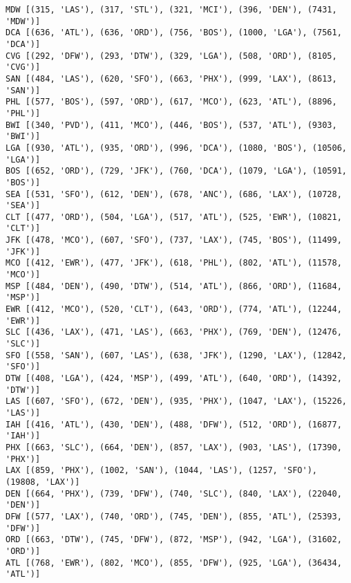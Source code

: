 \documentclass[11pt]{article}
\begin{document}
    \begin{Verbatim}[commandchars=\\\{\}]
MDW [(315, 'LAS'), (317, 'STL'), (321, 'MCI'), (396, 'DEN'), (7431, 'MDW')]
DCA [(636, 'ATL'), (636, 'ORD'), (756, 'BOS'), (1000, 'LGA'), (7561, 'DCA')]
CVG [(292, 'DFW'), (293, 'DTW'), (329, 'LGA'), (508, 'ORD'), (8105, 'CVG')]
SAN [(484, 'LAS'), (620, 'SFO'), (663, 'PHX'), (999, 'LAX'), (8613, 'SAN')]
PHL [(577, 'BOS'), (597, 'ORD'), (617, 'MCO'), (623, 'ATL'), (8896, 'PHL')]
BWI [(340, 'PVD'), (411, 'MCO'), (446, 'BOS'), (537, 'ATL'), (9303, 'BWI')]
LGA [(930, 'ATL'), (935, 'ORD'), (996, 'DCA'), (1080, 'BOS'), (10506, 'LGA')]
BOS [(652, 'ORD'), (729, 'JFK'), (760, 'DCA'), (1079, 'LGA'), (10591, 'BOS')]
SEA [(531, 'SFO'), (612, 'DEN'), (678, 'ANC'), (686, 'LAX'), (10728, 'SEA')]
CLT [(477, 'ORD'), (504, 'LGA'), (517, 'ATL'), (525, 'EWR'), (10821, 'CLT')]
JFK [(478, 'MCO'), (607, 'SFO'), (737, 'LAX'), (745, 'BOS'), (11499, 'JFK')]
MCO [(412, 'EWR'), (477, 'JFK'), (618, 'PHL'), (802, 'ATL'), (11578, 'MCO')]
MSP [(484, 'DEN'), (490, 'DTW'), (514, 'ATL'), (866, 'ORD'), (11684, 'MSP')]
EWR [(412, 'MCO'), (520, 'CLT'), (643, 'ORD'), (774, 'ATL'), (12244, 'EWR')]
SLC [(436, 'LAX'), (471, 'LAS'), (663, 'PHX'), (769, 'DEN'), (12476, 'SLC')]
SFO [(558, 'SAN'), (607, 'LAS'), (638, 'JFK'), (1290, 'LAX'), (12842, 'SFO')]
DTW [(408, 'LGA'), (424, 'MSP'), (499, 'ATL'), (640, 'ORD'), (14392, 'DTW')]
LAS [(607, 'SFO'), (672, 'DEN'), (935, 'PHX'), (1047, 'LAX'), (15226, 'LAS')]
IAH [(416, 'ATL'), (430, 'DEN'), (488, 'DFW'), (512, 'ORD'), (16877, 'IAH')]
PHX [(663, 'SLC'), (664, 'DEN'), (857, 'LAX'), (903, 'LAS'), (17390, 'PHX')]
LAX [(859, 'PHX'), (1002, 'SAN'), (1044, 'LAS'), (1257, 'SFO'), (19808, 'LAX')]
DEN [(664, 'PHX'), (739, 'DFW'), (740, 'SLC'), (840, 'LAX'), (22040, 'DEN')]
DFW [(577, 'LAX'), (740, 'ORD'), (745, 'DEN'), (855, 'ATL'), (25393, 'DFW')]
ORD [(663, 'DTW'), (745, 'DFW'), (872, 'MSP'), (942, 'LGA'), (31602, 'ORD')]
ATL [(768, 'EWR'), (802, 'MCO'), (855, 'DFW'), (925, 'LGA'), (36434, 'ATL')]

    \end{Verbatim}
\end{document}

